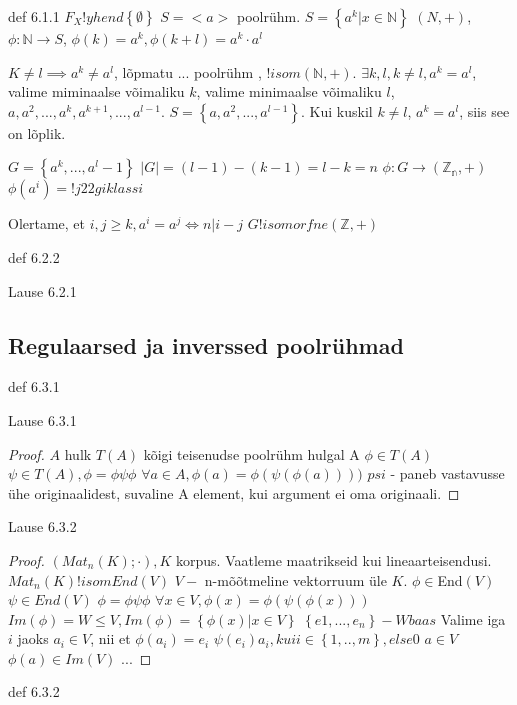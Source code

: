 \documentclass[12pt]{report}
\numberwithin{equation}{section}
\theoremstyle{definition}
\theoremstyle{plain}
\begin{document}
def 6.1.1
$F_X !yhend \left\lbrace \emptyset \right\rbrace$
$S = <a>$ poolr\"uhm.
$S = \left\lbrace a^k | x \in \mathbb{N} \right\rbrace $
$(N, +)$, $\phi : \mathbb{N} \to S$, $\phi(k) = a^k,\phi(k+l) = a^k \cdot a^l$

$K \neq l \implies a^k \neq a^l$, lõpmatu ... poolr\"uhm , $!isom (\mathbb{N},+)$.
$\exists k,l, k \neq l, a^k = a^l$, valime miminaalse võimaliku $k$, valime minimaalse võimaliku $l$, $a,a^2,...,a^k, a^{k+1},...,a^{l-1}$. $S = \left\lbrace a,a^2,...,a^{l-1} \right\rbrace$. Kui kuskil $k \neq l$, $a^k = a^l$, siis see on lõplik.

$G = \left\lbrace a^k,...,a^l-1 \right\rbrace$
$|G| = (l-1) - (k-1) = l-k  = n$
$\phi : G \to (\mathbb{Z_n},+)$
$\phi(a^i) = !j22giklass i$

Olertame, et $i,j \geq k, a^i = a^j \iff n | i-j$
$G !isomorfne (\mathbb{Z},+)$

def 6.2.2

Lause 6.2.1

\subsection{Regulaarsed ja inverssed poolr\"uhmad}

def 6.3.1

Lause 6.3.1

\begin{proof}
$A$ hulk
$T(A)$ kõigi teisenudse poolr\"uhm hulgal A
$\phi \in T(A)$
$\psi \in T(A), \phi = \phi \psi \phi$
$\forall a \in A, \phi(a) = \phi(\psi(\phi(a))))$
$psi$ - paneb vastavusse \"uhe originaalidest, suvaline A element, kui argument ei oma originaali.
\end{proof}

Lause 6.3.2

\begin{proof}
$(Mat_{n} (K); \cdot), K$ korpus.
Vaatleme maatrikseid kui lineaarteisendusi. 
$Mat_{n} (K) !isom End(V)$
$V -$ n-mõõtmeline vektorruum \"ule $K$.
$\phi \in $End$(V)$
$\psi \in End(V)$
$\phi = \phi \psi \phi$
$\forall x \in V, \phi(x) = \phi( \psi ( \phi (x)))$
$Im(\phi) = W \leq V, Im(\phi) = \left\lbrace \phi(x) | x \in V \right\rbrace $
$\left\lbrace e1,...,e_n \right\rbrace - W baas$
Valime iga $i$ jaoks $a_i \in V$, nii et $\phi(a_i) = e_i$
$\psi(e_i) a_i, kui i \in \left\lbrace 1,..,m \right\rbrace, else 0$
$a \in V$
$\phi(a) \in Im (V)$
...
\end{proof}

def 6.3.2
\end{document}
